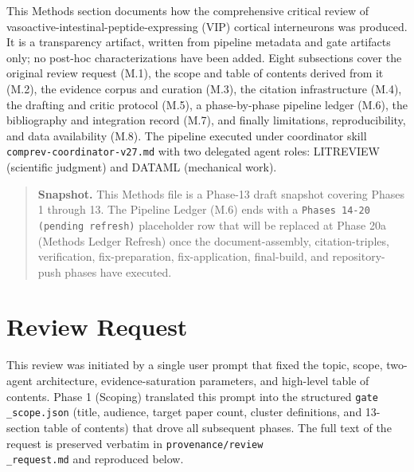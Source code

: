\documentclass[11pt]{article}
\begin{document}
This Methods section documents how the comprehensive critical review of vasoactive-intestinal-peptide-expressing (VIP) cortical interneurons was produced. It is a transparency artifact, written from pipeline metadata and gate artifacts only; no post-hoc characterizations have been added. Eight subsections cover the original review request (M.1), the scope and table of contents derived from it (M.2), the evidence corpus and curation (M.3), the citation infrastructure (M.4), the drafting and critic protocol (M.5), a phase-by-phase pipeline ledger (M.6), the bibliography and integration record (M.7), and finally limitations, reproducibility, and data availability (M.8). The pipeline executed under coordinator skill \texttt{comprev-coordinator-v27.md} with two delegated agent roles: LITREVIEW (scientific judgment) and DATAML (mechanical work).

\begin{quote}
\textbf{Snapshot.} This Methods file is a Phase-13 draft snapshot covering Phases 1 through 13. The Pipeline Ledger (M.6) ends with a \texttt{Phases 14-20 (pending refresh)} placeholder row that will be replaced at Phase 20a (Methods Ledger Refresh) once the document-assembly, citation-triples, verification, fix-preparation, fix-application, final-build, and repository-push phases have executed.
\end{quote}

\section{Review Request}\label{sec-methods-review-request}

This review was initiated by a single user prompt that fixed the topic, scope, two-agent architecture, evidence-saturation parameters, and high-level table of contents. Phase 1 (Scoping) translated this prompt into the structured \texttt{gate\\_scope.json} (title, audience, target paper count, cluster definitions, and 13-section table of contents) that drove all subsequent phases. The full text of the request is preserved verbatim in \texttt{provenance/review\\_request.md} and reproduced below.
\end{document}
